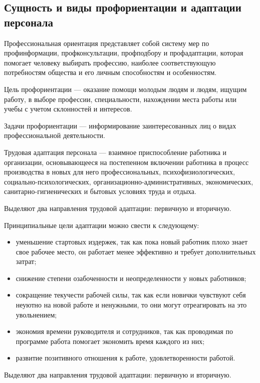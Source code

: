 \documentclass[a4paper,12pt,oneside,final]{extarticle}
\numberwithin{equation}{section}
\begin{document}
\subsection{Сущность и виды профориентации и адаптации персонала}
Профессиональная ориентация представляет собой систему мер по профинформации, профконсультации, профподбору и профадаптации, которая помогает человеку выбирать профессию, наиболее соответствующую потребностям общества и его личным способностям и особенностям.

Цель профориентации --- оказание помощи молодым людям и людям, ищущим работу, в выборе профессии, специальности, нахождении места работы или учебы с учетом склонностей и интересов.

Задачи профориентации --- информирование заинтересованных лиц о видах профессиональной деятельности.

Трудовая адаптация персонала --- взаимное приспособление работника и организации, основывающееся на постепенном включении работника в процесс производства в новых для него профессиональных, психофизиологических, социально-психологических, организационно-административных, экономических, санитарно-гигиенических и бытовых условиях труда и отдыха.

Выделяют два направления трудовой адаптации: первичную и вторичную.

Принципиальные цели адаптации можно свести к следующему:
\begin{itemize}
	\item уменьшение стартовых издержек, так как пока новый работник плохо знает свое рабочее место, он работает менее эффективно и требует дополнительных затрат;
	\item снижение степени озабоченности и неопределенности у новых работников;
	\item сокращение текучести рабочей силы, так как если новички чувствуют себя неуютно на новой работе и ненужными, то они могут отреагировать на это увольнением;
	\item экономия времени руководителя и сотрудников, так как проводимая по программе работа помогает экономить время каждого из них;
	\item развитие позитивного отношения к работе, удовлетворенности работой.
\end{itemize}

Выделяют два направления трудовой адаптации: первичную и вторичную.
\end{document}
